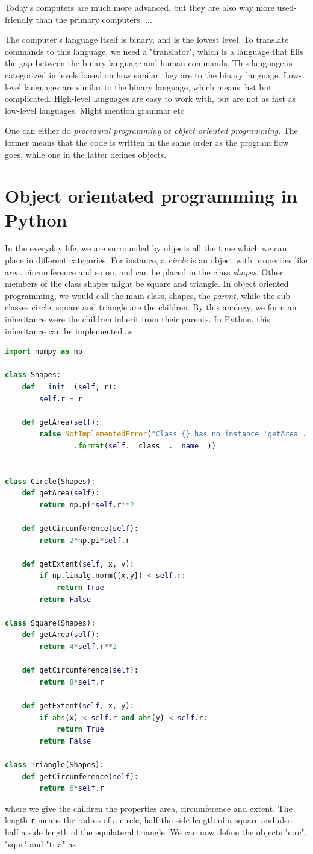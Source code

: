 Today's computers are much more advanced, but they are also way more used-friendly than the primary computers. ...


The computer's language itself is binary, and is the lowest level. To translate commands to this language, we need a "translator", which is a language that fills the gap between the binary language and human commands. This language is categorized in levels based on how similar they are to the binary language. Low-level languages are similar to the binary language, which means fast but complicated. High-level languages are easy to work with, but are not as fast as low-level languages. Might mention grammar etc

One can either do \textit{procedural programming} or \textit{object oriented programming}. The former means that the code is written in the same order as the program flow goes, while one in the latter defines objects. 

\section{Object orientated programming in Python}
In the everyday life, we are surrounded by objects all the time which we can place in different categories. For instance, a \textit{circle} is an object with properties like area, circumference and so on, and can be placed in the class \textit{shapes}. Other members of the class shapes might be square and triangle. In object oriented programming, we would call the main class, shapes, the \textit{parent}, while the sub-classes circle, square and triangle are the children. By this analogy, we form an inheritance were the children inherit from their parents. In Python, this inheritance can be implemented as

\lstset{basicstyle=\scriptsize}
\begin{lstlisting}[language=python]
import numpy as np

class Shapes:
	def __init__(self, r):
		self.r = r

	def getArea(self):
		raise NotImplementedError("Class {} has no instance 'getArea'."
				.format(self.__class__.__name__))


class Circle(Shapes):
	def getArea(self):
		return np.pi*self.r**2

	def getCircumference(self):
		return 2*np.pi*self.r

	def getExtent(self, x, y):
		if np.linalg.norm([x,y]) < self.r:
			return True
		return False

class Square(Shapes):
	def getArea(self):
		return 4*self.r**2

	def getCircumference(self):
		return 8*self.r

	def getExtent(self, x, y):
		if abs(x) < self.r and abs(y) < self.r:
			return True
		return False

class Triangle(Shapes):
	def getCircumference(self):
		return 6*self.r
\end{lstlisting}
where we give the children the properties area, circumference and extent. The length \texttt{r} means the radius of a circle, half the side length of a square and also half a side length of the equilateral triangle. We can now define the objects "circ", "squr" and "tria" as

